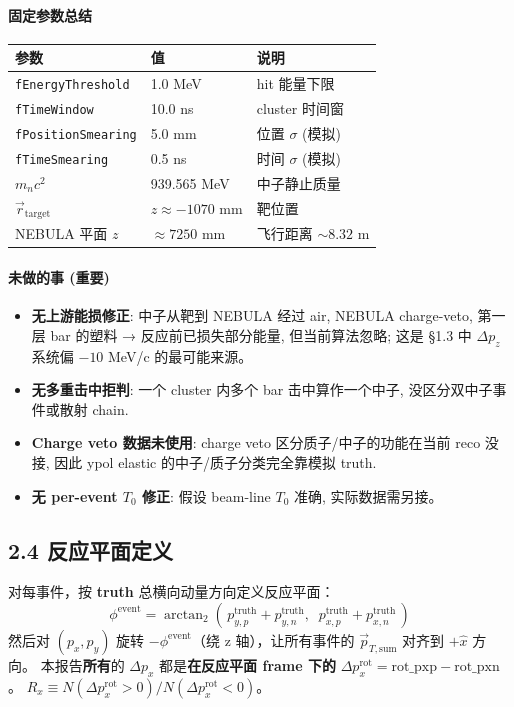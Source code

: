 \documentclass[a4paper,11pt]{article}
\begin{document}
\paragraph{固定参数总结}
\begin{tabular}{lll}
\toprule
参数 & 值 & 说明 \\
\midrule
\texttt{fEnergyThreshold}      & 1.0 MeV  & hit 能量下限 \\
\texttt{fTimeWindow}           & 10.0 ns  & cluster 时间窗 \\
\texttt{fPositionSmearing}     & 5.0 mm   & 位置 $\sigma$ (模拟) \\
\texttt{fTimeSmearing}         & 0.5 ns   & 时间 $\sigma$ (模拟) \\
$m_n c^2$                       & 939.565 MeV & 中子静止质量 \\
$\vec r_\text{target}$         & $z\approx -1070$ mm   & 靶位置 \\
NEBULA 平面 $z$                 & $\approx 7250$ mm     & 飞行距离 $\sim 8.32$ m \\
\bottomrule
\end{tabular}

\paragraph{未做的事 (重要)}
\begin{itemize}[nosep]
\item \textbf{无上游能损修正}: 中子从靶到 NEBULA 经过 air, NEBULA charge-veto, 第一层 bar 的塑料 → 反应前已损失部分能量, 但当前算法忽略; 这是 §1.3 中 $\Delta p_z$ 系统偏 $-10$ MeV/c 的最可能来源。
\item \textbf{无多重击中拒判}: 一个 cluster 内多个 bar 击中算作一个中子, 没区分双中子事件或散射 chain.
\item \textbf{Charge veto 数据未使用}: charge veto 区分质子/中子的功能在当前 reco 没接, 因此 ypol elastic 的中子/质子分类完全靠模拟 truth.
\item \textbf{无 per-event $T_0$ 修正}: 假设 beam-line $T_0$ 准确, 实际数据需另接。
\end{itemize}

\subsection*{2.4 反应平面定义}
对每事件，按 \textbf{truth} 总横向动量方向定义反应平面：
\[
  \phi^\text{event} = \arctan_2(\,p_{y,p}^\text{truth} + p_{y,n}^\text{truth},\;\; p_{x,p}^\text{truth} + p_{x,n}^\text{truth}\,)
\]
然后对 $(p_{x},p_{y})$ 旋转 $-\phi^\text{event}$（绕 z 轴），让所有事件的 $\vec p_{T,\text{sum}}$ 对齐到 $+\hat x$ 方向。
本报告\textbf{所有}的 $\Delta p_x$ 都是\textbf{在反应平面 frame 下的} $\Delta p_x^\text{rot} = \mathrm{rot\_pxp} - \mathrm{rot\_pxn}$。
$R_x \equiv N(\Delta p_x^\text{rot} > 0) / N(\Delta p_x^\text{rot} < 0)$。
\end{document}
